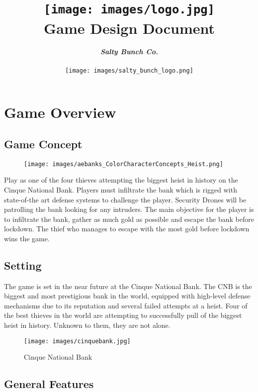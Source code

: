 \documentclass[10pt]{report}
\title{\texttt{[image: images/logo.jpg]}\\\textbf{Game Design Document}}
\author{\textbf{\textit{Salty Bunch Co.}}\\\\\texttt{[image: images/salty\_bunch\_logo.png]}}
\date{}
\begin{document}
\maketitle
\tableofcontents

\chapter{Game Overview}

\section{Game Concept}

\begin{figure}[H]
    \centering
    \texttt{[image: images/aebanks\_ColorCharacterConcepts\_Heist.png]}
    \caption{}
\end{figure}

Play as one of the four thieves attempting the biggest heist in history on the Cinque National Bank. Players must infiltrate the bank which is rigged with state-of-the art defense systems to challenge the player. Security Drones will be patrolling the bank looking for any intruders.
The main objective for the player is to infiltrate the bank, gather as much gold as possible and escape the bank before lockdown. The thief who manages to escape with the most gold before lockdown wins the game.


\section{Setting}

The game is set in the near future at the Cinque National Bank. The CNB is the biggest and most prestigious bank in the world, equipped with high-level defense mechanisms due to its reputation and several failed attempts at a heist. Four of the best thieves in the world are attempting to successfully pull of the biggest heist in history. Unknown to them, they are not alone.

\begin{figure}[H]
    \centering
    \texttt{[image: images/cinquebank.jpg]}
    \caption{Cinque National Bank}
\end{figure}

\section{General Features}
\end{document}
